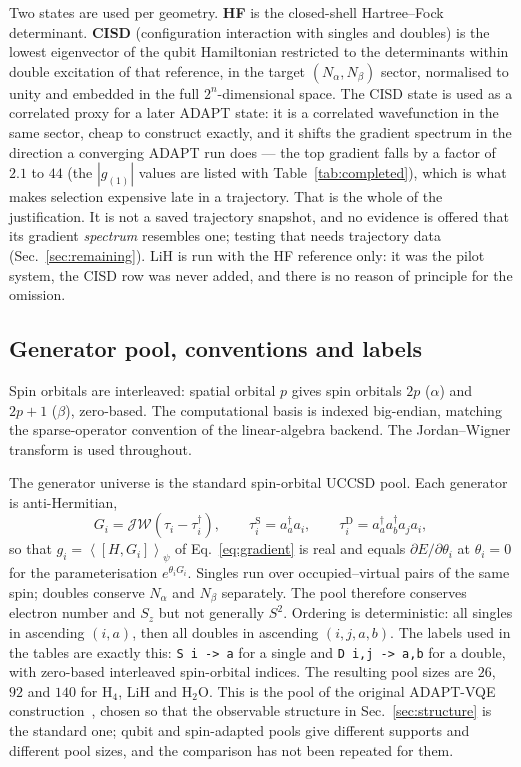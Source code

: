 \documentclass[10pt]{article}
\newcommand{\expect}[1]{\left\langle #1 \right\rangle}
\newcommand{\comm}[2]{\left[#1,#2\right]}
\begin{document}
Two states are used per geometry. \textbf{HF} is the closed-shell Hartree--Fock determinant. \textbf{CISD} (configuration interaction with singles and doubles) is the lowest eigenvector of the qubit Hamiltonian restricted to the determinants within double excitation of that reference, in the target $(N_\alpha,N_\beta)$ sector, normalised to unity and embedded in the full $2^{n}$-dimensional space. The CISD state is used as a correlated proxy for a later ADAPT state: it is a correlated wavefunction in the same sector, cheap to construct exactly, and it shifts the gradient spectrum in the direction a converging ADAPT run does --- the top gradient falls by a factor of $2.1$ to $44$ (the $|g_{(1)}|$ values are listed with Table~\ref{tab:completed}), which is what makes selection expensive late in a trajectory. That is the whole of the justification. It is not a saved trajectory snapshot, and no evidence is offered that its gradient \emph{spectrum} resembles one; testing that needs trajectory data (Sec.~\ref{sec:remaining}). LiH is run with the HF reference only: it was the pilot system, the CISD row was never added, and there is no reason of principle for the omission.

\subsection{Generator pool, conventions and labels}

Spin orbitals are interleaved: spatial orbital $p$ gives spin orbitals $2p$ ($\alpha$) and $2p+1$ ($\beta$), zero-based. The computational basis is indexed big-endian, matching the sparse-operator convention of the linear-algebra backend. The Jordan--Wigner transform is used throughout.

The generator universe is the standard spin-orbital UCCSD pool. Each generator is anti-Hermitian,
\begin{equation}
  G_i=\mathcal{JW}\!\left(\tau_i-\tau_i^\dagger\right),
  \qquad
  \tau_{i}^{\text{S}}=a_a^\dagger a_i,
  \qquad
  \tau_{i}^{\text{D}}=a_a^\dagger a_b^\dagger a_j a_i ,
\end{equation}
so that $g_i=\expect{\comm{H}{G_i}}_\psi$ of Eq.~\eqref{eq:gradient} is real and equals $\partial E/\partial\theta_i$ at $\theta_i=0$ for the parameterisation $e^{\theta_i G_i}$. Singles run over occupied--virtual pairs of the same spin; doubles conserve $N_\alpha$ and $N_\beta$ separately. The pool therefore conserves electron number and $S_z$ but not generally $S^2$. Ordering is deterministic: all singles in ascending $(i,a)$, then all doubles in ascending $(i,j,a,b)$. The labels used in the tables are exactly this: \texttt{S i -> a} for a single and \texttt{D i,j -> a,b} for a double, with zero-based interleaved spin-orbital indices. The resulting pool sizes are $26$, $92$ and $140$ for H$_4$, LiH and H$_2$O. This is the pool of the original ADAPT-VQE construction~\cite{Grimsley2019ADAPT}, chosen so that the observable structure in Sec.~\ref{sec:structure} is the standard one; qubit and spin-adapted pools give different supports and different pool sizes, and the comparison has not been repeated for them.
\end{document}
